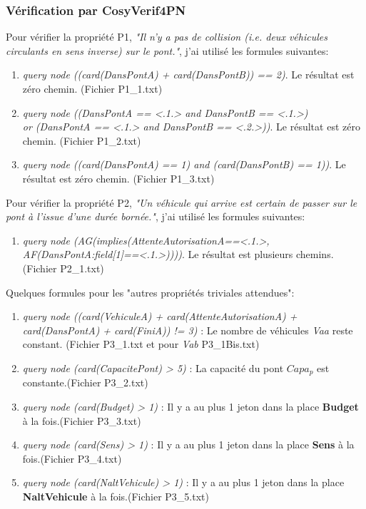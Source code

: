 \documentclass[a4paper,11pt]{report}
\begin{document}
\subsubsection{Vérification par CosyVerif4PN}
	Pour vérifier la propriété P1, \textit{"Il n'y a pas de collision (i.e. deux véhicules circulants en sens inverse) sur le pont."}, j'ai utilisé les formules suivantes:
	\begin{enumerate}
		\item \textit{query node ((card(DansPontA) + card(DansPontB)) == 2)}. Le résultat est zéro chemin. (Fichier P1\_1.txt)
		\item \textit{query node ((DansPontA == <.1.> and DansPontB == <.1.>) 
			\\or (DansPontA == <.1.> and DansPontB == <.2.>))}. Le résultat est zéro chemin. (Fichier P1\_2.txt)
		\item \textit{query node ((card(DansPontA) == 1) and (card(DansPontB) == 1))}. Le résultat est zéro chemin. (Fichier P1\_3.txt)
	\end{enumerate}
	
		Pour vérifier la propriété P2, \textit{"Un véhicule qui arrive est certain de passer sur le pont à l'issue d'une durée bornée."}, j'ai utilisé les formules suivantes:
		\begin{enumerate}
			\item \textit{query node (AG(implies(AttenteAutorisationA==<.1.>, AF(DansPontA:field[1]==<.1.>))))}. Le résultat est plusieurs chemins. (Fichier P2\_1.txt)
	\end{enumerate}
	
	Quelques formules pour les "autres propriétés triviales attendues":
		\begin{enumerate}
				\item \textit{query node ((card(VehiculeA) + card(AttenteAutorisationA) + card(DansPontA) + card(FiniA)) != 3)} : Le nombre de véhicules \textit{Vaa} reste constant. (Fichier P3\_1.txt et pour \textit{Vab} P3\_1Bis.txt)
				\item \textit{query node (card(CapacitePont) > 5)} : La capacité du pont $Capa_p$ est constante.(Fichier P3\_2.txt)
				\item \textit{query node (card(Budget) > 1)} : Il y a au plus 1 jeton dans la place \textbf{Budget} à la fois.(Fichier P3\_3.txt)
				\item \textit{query node (card(Sens) > 1)} : Il y a au plus 1 jeton dans la place \textbf{Sens} à la fois.(Fichier P3\_4.txt)
				\item \textit{query node (card(NaltVehicule) > 1)} : Il y a au plus 1 jeton dans la place \textbf{NaltVehicule} à la fois.(Fichier P3\_5.txt)
		\end{enumerate}
	
\end{document}
